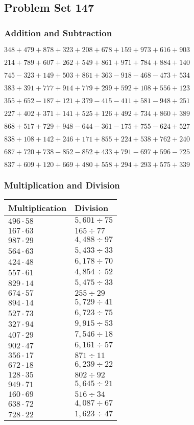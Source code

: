 \hypertarget{problem-set-147}{%
\subsection{Problem Set 147}\label{problem-set-147}}

\hypertarget{addition-and-subtraction}{%
\subsubsection{Addition and
Subtraction}\label{addition-and-subtraction}}

\(348 +479 +878 +323 +208 +678 +159 +973 +616 +903\)

\(214 +789 +607 +262 +549 +861 +971 +784 +884 +140\)

\(745 - 323 +149 +503 +861 +363 - 918 - 468 - 473 +534\)

\(383 +391 +777 +914 +779 +299 +592 +108 +556 +123\)

\(355 +652 - 187 +121 +379 - 415 - 411 +581 - 948 +251\)

\(227 +402 +371 +141 +525 +126 +492 +734 +860 +389\)

\(868 +517 +729 +948 - 644 - 361 - 175 +755 - 624 +527\)

\(838 +108 +142 +246 +171 +855 +224 +538 +762 +240\)

\(687 +720 +738 - 852 - 852 +433 +791 - 697 +596 - 725\)

\(837 +609 +120 +669 +480 +558 +294 +293 +575 +339\)

\hypertarget{multiplication-and-division}{%
\subsubsection{Multiplication and
Division}\label{multiplication-and-division}}

\begin{longtable}[]{@{}ll@{}}
\toprule
Multiplication & Division\tabularnewline
\midrule
\endhead
\(496 \cdot 58\) & \(5,601÷75\)\tabularnewline
\(167 \cdot 63\) & \(165÷77\)\tabularnewline
\(987 \cdot 29\) & \(4,488÷97\)\tabularnewline
\(564 \cdot 63\) & \(5,433÷33\)\tabularnewline
\(424 \cdot 48\) & \(6,178÷70\)\tabularnewline
\(557 \cdot 61\) & \(4,854÷52\)\tabularnewline
\(829 \cdot 14\) & \(5,475÷33\)\tabularnewline
\(674 \cdot 57\) & \(255÷29\)\tabularnewline
\(894 \cdot 14\) & \(5,729÷41\)\tabularnewline
\(527 \cdot 73\) & \(6,723÷75\)\tabularnewline
\(327 \cdot 94\) & \(9,915÷53\)\tabularnewline
\(407 \cdot 29\) & \(7,546÷18\)\tabularnewline
\(902 \cdot 47\) & \(6,161÷57\)\tabularnewline
\(356 \cdot 17\) & \(871÷11\)\tabularnewline
\(672 \cdot 18\) & \(6,239÷22\)\tabularnewline
\(128 \cdot 35\) & \(802÷92\)\tabularnewline
\(949 \cdot 71\) & \(5,645÷21\)\tabularnewline
\(160 \cdot 69\) & \(516÷34\)\tabularnewline
\(638 \cdot 72\) & \(4,087÷67\)\tabularnewline
\(728 \cdot 22\) & \(1,623÷47\)\tabularnewline
\bottomrule
\end{longtable}
